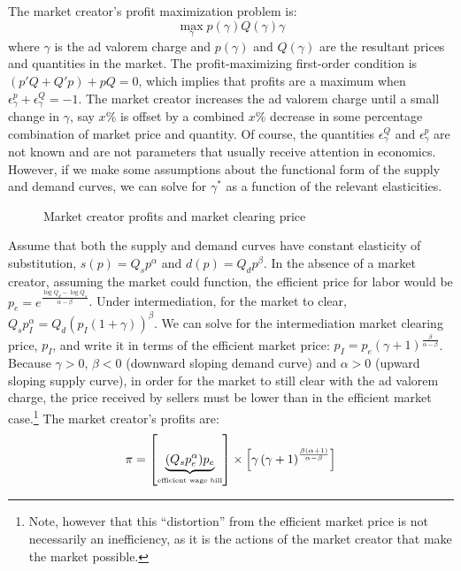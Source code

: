 \documentclass{llncs}
\begin{document}
The market creator's profit maximization problem is:
\begin{equation}
\max_\gamma p(\gamma) Q(\gamma) \gamma
\end{equation} 
where $\gamma$ is the ad valorem charge and $p(\gamma)$ and
$Q(\gamma)$ are the resultant prices and quantities in the market. The
profit-maximizing first-order condition is $\left(p'Q + Q'p \right) +
pQ = 0$, which implies that profits are a maximum when
$\epsilon^p_\gamma + \epsilon^Q_\gamma = -1$. The market creator increases the
ad valorem charge until a small change in $\gamma$, say $x\%$ is
offset by a combined $x\%$ decrease in some percentage combination of
market price and quantity. Of course, the quantities
$\epsilon^Q_\gamma$ and $\epsilon^p_\gamma$ are not known and are not
parameters that usually receive attention in economics. However, if we
make some assumptions about the functional form of the supply and
demand curves, we can solve for $\gamma^*$ as a function of the
relevant elasticities.
\begin{figure}[htb]
\begin{center}
 \scalebox{.3}{}
\end{center}
\caption{Market creator profits and market clearing price \label{fig:av}}
\end{figure}
Assume that both the supply and demand curves have constant elasticity
of substitution, $s(p) = Q_sp^\alpha$ and $d(p) = Q_dp^\beta$.  In the
absence of a market creator, assuming the market could function, the efficient
price for labor would be $p_e =e^{\frac{\log Q_d- \log Q_s}{\alpha
    -\beta }}$.  Under intermediation, for the market to clear,
$Q_sp_I^\alpha=Q_d(p_I(1+\gamma))^\beta$. We can solve for the
intermediation market clearing price, $p_I$, and write it in terms of
the efficient market price: $p_I = p_e (\gamma +1)^{\frac{\beta
  }{\alpha -\beta }}$. Because $\gamma > 0$, $\beta < 0$ (downward
sloping demand curve) and $\alpha > 0$ (upward sloping supply curve),
in order for the market to still clear with the ad valorem charge, the price
received by sellers must be lower than in the efficient
market case.\footnote{Note, however that this ``distortion'' from the
  efficient market price is not necessarily an inefficiency, as it is
  the actions of the market creator that make the market possible.} The market creator's profits are:
\begin{equation}
\pi = \left[\underbrace{(Q_sp_e^\alpha) p_e}_{\mbox{\tiny{efficient wage bill}}} \right] \times 
 \left[  \gamma \left(\gamma
   +1\right)^{\frac{\beta (\alpha +1)}{\alpha -\beta}} \right]
\end{equation} 
\end{document}
